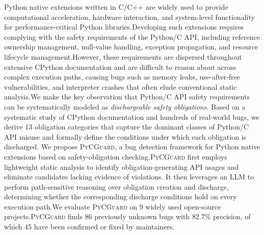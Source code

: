 
Python native extensions written in C/C++ are widely used to provide computational acceleration, hardware interaction, and system-level functionality for performance-critical Python libraries.Developing such extensions requires complying with the safety requirements of the Python/C API, including reference ownership management, null-value handling, exception propagation, and resource lifecycle management.However, these requirements are dispersed throughout extensive CPython documentation and are difficult to reason about across complex execution paths, causing bugs such as memory leaks, use-after-free vulnerabilities, and interpreter crashes that often elude conventional static analysis.We make the key observation that Python/C API safety requirements can be systematically modeled as \emph{dischargeable safety obligations}.
Based on a systematic study of CPython documentation and hundreds of real-world bugs, we derive 13 obligation categories that capture the dominant classes of Python/C API misuse and formally define the conditions under which each obligation is discharged.
We propose \textsc{PyCGuard}, a bug detection framework for Python native extensions based on safety-obligation checking.\textsc{PyCGuard} first employs lightweight static analysis to identify obligation-generating API usages and eliminate candidates lacking evidence of violations.
It then leverages an LLM to perform path-sensitive reasoning over obligation creation and discharge, determining whether the corresponding discharge conditions hold on every execution path.We evaluate \textsc{PyCGuard} on 9 widely used open-source projects.\textsc{PyCGuard} finds 86 previously unknown bugs with 82.7\% precision, of which 45 have been confirmed or fixed by maintainers.